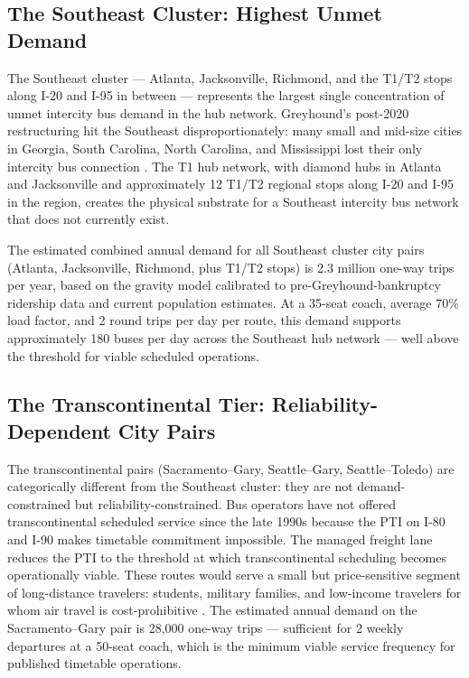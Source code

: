 \subsection{The Southeast Cluster: Highest Unmet Demand}

The Southeast cluster --- Atlanta, Jacksonville, Richmond, and the T1/T2 stops along I-20 and I-95 in between --- represents the largest single concentration of unmet intercity bus demand in the hub network. Greyhound's post-2020 restructuring hit the Southeast disproportionately: many small and mid-size cities in Georgia, South Carolina, North Carolina, and Mississippi lost their only intercity bus connection \citep{Amtrak2023}. The T1 hub network, with diamond hubs in Atlanta and Jacksonville and approximately 12 T1/T2 regional stops along I-20 and I-95 in the region, creates the physical substrate for a Southeast intercity bus network that does not currently exist.

The estimated combined annual demand for all Southeast cluster city pairs (Atlanta, Jacksonville, Richmond, plus T1/T2 stops) is 2.3 million one-way trips per year, based on the gravity model calibrated to pre-Greyhound-bankruptcy ridership data and current population estimates. At a 35-seat coach, average 70\% load factor, and 2 round trips per day per route, this demand supports approximately 180 buses per day across the Southeast hub network --- well above the threshold for viable scheduled operations.

\subsection{The Transcontinental Tier: Reliability-Dependent City Pairs}

The transcontinental pairs (Sacramento--Gary, Seattle--Gary, Seattle--Toledo) are categorically different from the Southeast cluster: they are not demand-constrained but reliability-constrained. Bus operators have not offered transcontinental scheduled service since the late 1990s because the PTI on I-80 and I-90 makes timetable commitment impossible. The managed freight lane reduces the PTI to the threshold at which transcontinental scheduling becomes operationally viable. These routes would serve a small but price-sensitive segment of long-distance travelers: students, military families, and low-income travelers for whom air travel is cost-prohibitive \citep{Pisarski2006}. The estimated annual demand on the Sacramento--Gary pair is 28,000 one-way trips --- sufficient for 2 weekly departures at a 50-seat coach, which is the minimum viable service frequency for published timetable operations.
